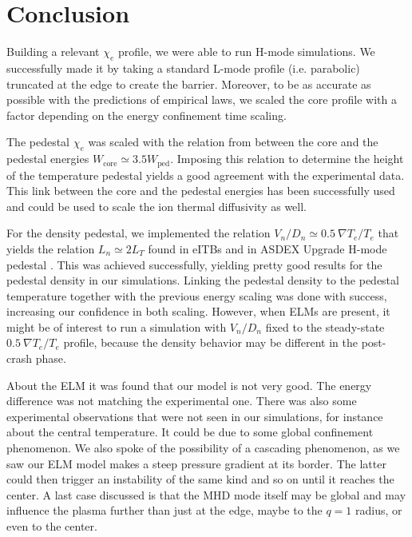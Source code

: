 \chapter{Conclusion}\thispagestyle{fancy}
Building a relevant $\chi_e$ profile, we were able to run H-mode simulations. We successfully made it by taking a standard L-mode profile (i.e. parabolic) truncated at the edge to create the barrier. Moreover, to be as accurate as possible with the predictions of empirical laws, we scaled the core profile with a factor depending on the energy confinement time scaling.

The pedestal $\chi_e$ was scaled with the relation from \cite{andreas2010} between the core and the pedestal energies $W_{\textrm{core}} \simeq 3.5 W_{\textrm{ped}}$. Imposing this relation to determine the height of the temperature pedestal yields a good agreement with the experimental data. This link between the core and the pedestal energies has been successfully used and could be used to scale the ion thermal diffusivity as well.

For the density pedestal, we implemented the relation $V_n / D_n \simeq 0.5\ \nabla T_e / T_e$ that yields the relation $L_n \simeq 2 L_T$ found in eITBs \cite{fable2006} and in ASDEX Upgrade H-mode pedestal \cite{neuhauser2002}. This was achieved successfully, yielding pretty good results for the pedestal density in our simulations. Linking the pedestal density to the pedestal temperature together with the previous energy scaling was done with success, increasing our confidence in both scaling. However, when ELMs are present, it might be of interest to run a simulation with $V_n / D_n$ fixed to the steady-state $0.5\ \nabla T_e / T_e$ profile, because the density behavior may be different in the post-crash phase.

About the ELM it was found that our model is not very good. The energy difference was not matching the experimental one. There was also some experimental observations that were not seen in our simulations, for instance about the central temperature. It could be due to some global confinement phenomenon. We also spoke of the possibility of a cascading phenomenon, as we saw our ELM model makes a steep pressure gradient at its border. The latter could then trigger an instability of the same kind and so on until it reaches the center. A last case discussed is that the MHD mode itself may be global and may influence the plasma further than just at the edge, maybe to the $q = 1$ radius, or even to the center.%

